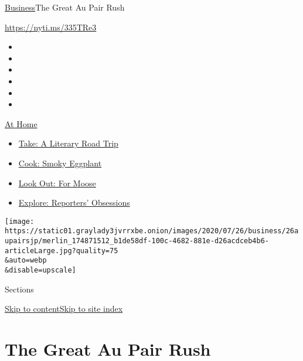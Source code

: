 \href{/section/business}{Business}\textbar{}The Great Au Pair Rush

\url{https://nyti.ms/335TRe3}

\begin{itemize}
\item
\item
\item
\item
\item
\item
\end{itemize}

\href{https://www.nytimes3xbfgragh.onion/spotlight/at-home?action=click\&pgtype=Article\&state=default\&region=TOP_BANNER\&context=at_home_menu}{At
Home}

\begin{itemize}
\tightlist
\item
  \href{https://www.nytimes3xbfgragh.onion/2020/07/28/books/time-for-a-literary-road-trip.html?action=click\&pgtype=Article\&state=default\&region=TOP_BANNER\&context=at_home_menu}{Take:
  A Literary Road Trip}
\item
  \href{https://www.nytimes3xbfgragh.onion/2020/07/29/magazine/bored-with-your-home-cooking-some-smoky-eggplant-will-fix-that.html?action=click\&pgtype=Article\&state=default\&region=TOP_BANNER\&context=at_home_menu}{Cook:
  Smoky Eggplant}
\item
  \href{https://www.nytimes3xbfgragh.onion/2020/07/27/travel/moose-michigan-isle-royale.html?action=click\&pgtype=Article\&state=default\&region=TOP_BANNER\&context=at_home_menu}{Look
  Out: For Moose}
\item
  \href{https://www.nytimes3xbfgragh.onion/interactive/2020/at-home/even-more-reporters-editors-diaries-lists-recommendations.html?action=click\&pgtype=Article\&state=default\&region=TOP_BANNER\&context=at_home_menu}{Explore:
  Reporters' Obsessions}
\end{itemize}

\texttt{[image: https://static01.graylady3jvrrxbe.onion/images/2020/07/26/business/26aupairsjp/merlin\_174871512\_b1de58df-100c-4682-881e-d26acdceb4b6-articleLarge.jpg?quality=75\\\&auto=webp\\\&disable=upscale]}

Sections

\protect\hyperlink{site-content}{Skip to
content}\protect\hyperlink{site-index}{Skip to site index}

\hypertarget{the-great-au-pair-rush}{%
\section{The Great Au Pair Rush}\label{the-great-au-pair-rush}}

